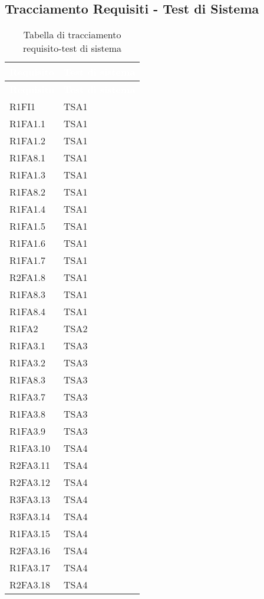 \subsection{Tracciamento Requisiti - Test di Sistema}
{
\renewcommand{\arraystretch}{1.5}
\centering
\begin{longtable}{C{4cm} C{4cm}}
\caption{Tabella di tracciamento requisito-test di sistema}\\
\textcolor{white}{\textbf{Requisito}} & \textcolor{white}{\textbf{Test di sistema}}\\	
\endfirsthead
{}
\textcolor{white}{\textbf{Requisito}} & \textcolor{white}{\textbf{Test di sistema}}\\	
\endhead

R1FI1 & TSA1  \\
R1FA1.1 & TSA1  \\
R1FA1.2 & TSA1  \\
R1FA8.1 & TSA1  \\
R1FA1.3 & TSA1  \\
R1FA8.2 & TSA1  \\
R1FA1.4 & TSA1  \\
R1FA1.5 & TSA1  \\
R1FA1.6 & TSA1  \\
R1FA1.7 & TSA1  \\
R2FA1.8 & TSA1  \\
R1FA8.3 & TSA1  \\
R1FA8.4 & TSA1  \\

R1FA2 & TSA2  \\

R1FA3.1 & TSA3  \\
R1FA3.2 & TSA3  \\
R1FA8.3 & TSA3  \\
R1FA3.7 & TSA3  \\
R1FA3.8 & TSA3  \\
R1FA3.9 & TSA3  \\

R1FA3.10 & TSA4  \\
R2FA3.11 & TSA4  \\
R2FA3.12 & TSA4  \\
R3FA3.13 & TSA4  \\
R3FA3.14 & TSA4  \\
R1FA3.15 & TSA4  \\
R2FA3.16 & TSA4  \\
R1FA3.17 & TSA4  \\
R2FA3.18 & TSA4  \\


\end{longtable}}
